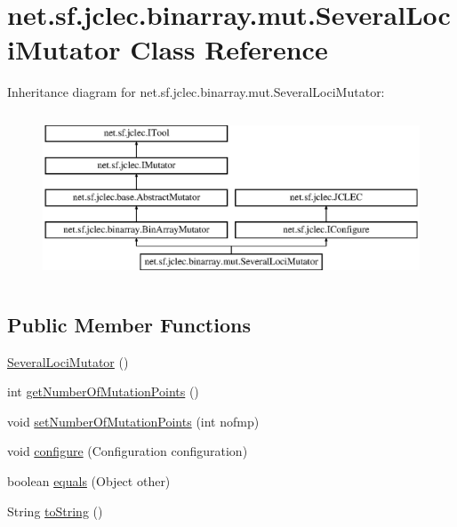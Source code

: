 \hypertarget{classnet_1_1sf_1_1jclec_1_1binarray_1_1mut_1_1_several_loci_mutator}{\section{net.\-sf.\-jclec.\-binarray.\-mut.\-Several\-Loci\-Mutator Class Reference}
\label{classnet_1_1sf_1_1jclec_1_1binarray_1_1mut_1_1_several_loci_mutator}
}
Inheritance diagram for net.\-sf.\-jclec.\-binarray.\-mut.\-Several\-Loci\-Mutator\-:\begin{figure}[H]
\begin{center}
\leavevmode
\includegraphics[height=5.000000cm]{classnet_1_1sf_1_1jclec_1_1binarray_1_1mut_1_1_several_loci_mutator}
\end{center}
\end{figure}
\subsection*{Public Member Functions}
\begin{DoxyCompactItemize}
\item 
\hyperlink{classnet_1_1sf_1_1jclec_1_1binarray_1_1mut_1_1_several_loci_mutator_a7d6afc350148cf72f30f3839fa027319}{Several\-Loci\-Mutator} ()
\item 
int \hyperlink{classnet_1_1sf_1_1jclec_1_1binarray_1_1mut_1_1_several_loci_mutator_ab59827d1dbf2eca9b5f1a600b9a9f80f}{get\-Number\-Of\-Mutation\-Points} ()
\item 
void \hyperlink{classnet_1_1sf_1_1jclec_1_1binarray_1_1mut_1_1_several_loci_mutator_a52a43e3107bde940c29aaa7514220dfd}{set\-Number\-Of\-Mutation\-Points} (int nofmp)
\item 
void \hyperlink{classnet_1_1sf_1_1jclec_1_1binarray_1_1mut_1_1_several_loci_mutator_a6469cf24da2f55cf42524d2d40c7a4d3}{configure} (Configuration configuration)
\item 
boolean \hyperlink{classnet_1_1sf_1_1jclec_1_1binarray_1_1mut_1_1_several_loci_mutator_a25988100a0d054e6b73c50443f5dd64a}{equals} (Object other)
\item 
String \hyperlink{classnet_1_1sf_1_1jclec_1_1binarray_1_1mut_1_1_several_loci_mutator_a8a4092ba8595f38b2ed4df7030a41d0a}{to\-String} ()
\end{DoxyCompactItemize}
